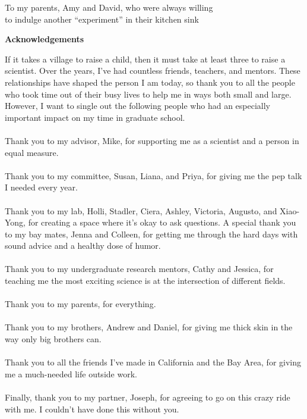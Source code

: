 \documentclass[11pt,letterpaper,oneside]{book}
\begin{document}
\setcounter{page}{1}  %

\null  %
\vfill
\begin{center}
    To my parents, Amy and David, who were always willing\\
    to indulge another ``experiment'' in their kitchen sink
\end{center}
\vfill
\clearpage

\begin{center}
    \bfseries\Large Acknowledgements
\end{center}
\bigskip
If it takes a village to raise a child, then it must take at least three to raise a scientist. Over the years, I've had countless friends, teachers, and mentors. These relationships have shaped the person I am today, so thank you to all the people who took time out of their busy lives to help me in ways both small and large. However, I want to single out the following people who had an especially important impact on my time in graduate school.\\\\
Thank you to my advisor, Mike, for supporting me as a scientist and a person in equal measure.\\\\
Thank you to my committee, Susan, Liana, and Priya, for giving me the pep talk I needed every year.\\\\
Thank you to my lab, Holli, Stadler, Ciera, Ashley, Victoria, Augusto, and Xiao-Yong, for creating a space where it's okay to ask questions. A special thank you to my bay mates, Jenna and Colleen, for getting me through the hard days with sound advice and a healthy dose of humor.\\\\
Thank you to my undergraduate research mentors, Cathy and Jessica, for teaching me the most exciting science is at the intersection of different fields.\\\\
Thank you to my parents, for everything.\\\\
Thank you to my brothers, Andrew and Daniel, for giving me thick skin in the way only big brothers can.\\\\
Thank you to all the friends I've made in California and the Bay Area, for giving me a much-needed life outside work.\\\\
Finally, thank you to my partner, Joseph, for agreeing to go on this crazy ride with me. I couldn't have done this without you.
\clearpage
\end{document}
